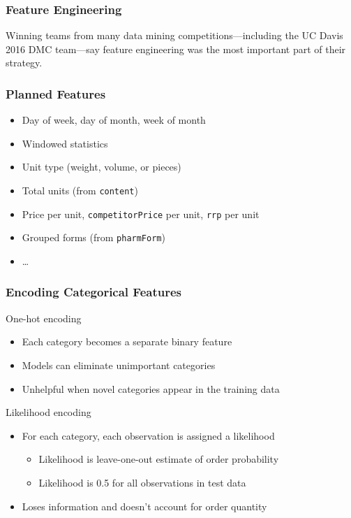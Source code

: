 \documentclass{beamer}
\begin{document}
\begin{frame}
  \frametitle{Feature Engineering}
  Winning teams from many data mining competitions---including the UC Davis
  2016 DMC team---say feature engineering was the most important part of their
  strategy.
\end{frame}

\begin{frame}
  \frametitle{Planned Features}
  \begin{itemize}
    \item Day of week, day of month, week of month
    \item Windowed statistics
    \item Unit type (weight, volume, or pieces)
    \item Total units (from \texttt{content})
    \item Price per unit, \texttt{competitorPrice} per unit, \texttt{rrp} per
    unit
    \item Grouped forms (from \texttt{pharmForm})
    \item \dots
  \end{itemize}
\end{frame}

\begin{frame}
  \frametitle{Encoding Categorical Features}

  \begin{block}{One-hot encoding}
  \begin{itemize}
    \item Each category becomes a separate binary feature
    \item Models can eliminate unimportant categories
    \item Unhelpful when novel categories appear in the training data
  \end{itemize}
  \end{block}

  \begin{block}{Likelihood encoding}
  \begin{itemize}
    \item For each category, each observation is assigned a likelihood
    \begin{itemize}
      \item Likelihood is leave-one-out estimate of order probability
      \item Likelihood is 0.5 for all observations in test data
    \end{itemize}
    \item Loses information and doesn't account for order quantity
  \end{itemize}
  \end{block}
\end{frame}
\end{document}

